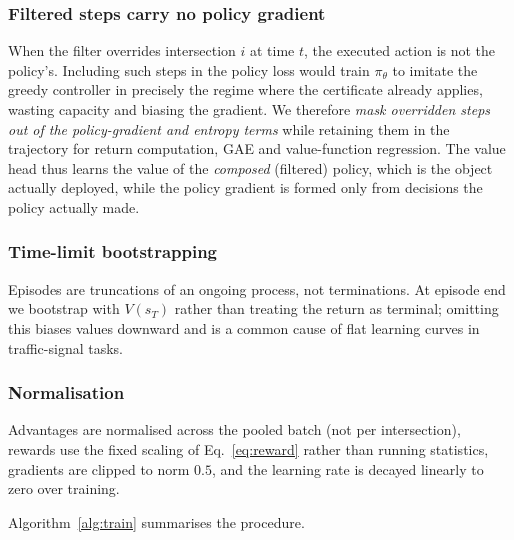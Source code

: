 \documentclass[journal]{IEEEtran}
\begin{document}
\subsubsection{Filtered steps carry no policy gradient}
When the filter overrides intersection $i$ at time $t$, the executed
action is not the policy's. Including such steps in the policy loss would
train $\pi_\theta$ to imitate the greedy controller in precisely the
regime where the certificate already applies, wasting capacity and
biasing the gradient. We therefore \emph{mask overridden steps out of the
policy-gradient and entropy terms} while retaining them in the trajectory
for return computation, GAE and value-function regression. The value
head thus learns the value of the \emph{composed} (filtered) policy,
which is the object actually deployed, while the policy gradient is
formed only from decisions the policy actually made.

\subsubsection{Time-limit bootstrapping}
Episodes are truncations of an ongoing process, not terminations. At
episode end we bootstrap with $V(s_T)$ rather than treating the return as
terminal; omitting this biases values downward and is a common cause of
flat learning curves in traffic-signal tasks.

\subsubsection{Normalisation}
Advantages are normalised across the pooled batch (not per
intersection), rewards use the fixed scaling of Eq.~\eqref{eq:reward}
rather than running statistics, gradients are clipped to norm $0.5$, and
the learning rate is decayed linearly to zero over training.

Algorithm~\ref{alg:train} summarises the procedure.
\end{document}
